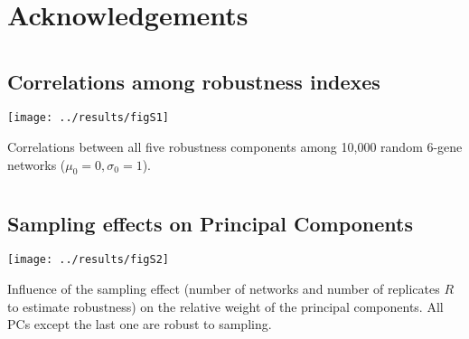 \documentclass[10pt,a4paper]{article}
\begin{document}
\section*{Acknowledgements}



\printbibliography




\clearpage



\begin{appendices}
  \setcounter{section}{0}
  \renewcommand{\thesection}{\arabic{section}}

  \clearpage
  \section{}
    \label{supp:fullcorr}
    \subsection*{Correlations among robustness indexes}
	\begin{adjustwidth}{-1in}{0in}
	\begin{flushright}
	\texttt{[image: ../results/figS1]}
	\end{flushright}

	\color{Gray} Correlations between all five robustness components among 10,000 random 6-gene networks ($\mu_0=0, \sigma_0=1$). 
	\end{adjustwidth}

  \clearpage
  \section{}
    \label{supp:PC}
    \subsection*{Sampling effects on Principal Components}
    
	\begin{center}
	\texttt{[image: ../results/figS2]}
	\end{center}    

	{\color{Gray} Influence of the sampling effect (number of networks and number of replicates $R$ to estimate robustness) on the relative
	weight of the principal components. All PCs except the last one are robust to sampling. }


  \clearpage
  \section{}
    \label{supp:W}

\end{appendices}
\end{document}
